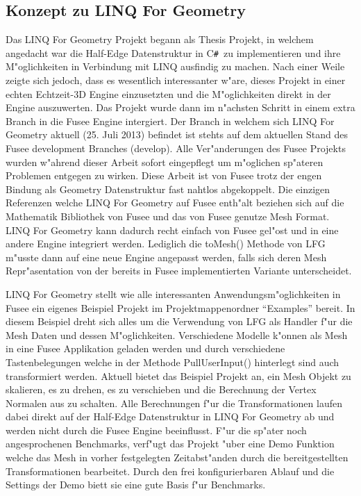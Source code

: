 \documentclass[pagesize, paper=a4, fontsize=12pt,titlepage=true, headings=small, headnosepline, abstractoff, liststotoc, nochapterprefix, plainheadsepline]{scrreprt}
\newcommand{\CSS}{C\texttt{\# }}
\newcommand{\LFG}{LINQ For Geometry}
\newcommand{\LFGS}{LINQ For Geometry }
\newcommand{\HES}{Half-Edge Datenstruktur }
\begin{document}
		\subsection {Konzept zu \LFG}
			Das \LFGS Projekt begann als Thesis Projekt, in welchem angedacht war die \HES in \CSS zu implementieren und ihre M"oglichkeiten in Verbindung mit LINQ ausfindig zu machen. Nach einer Weile zeigte sich jedoch, dass es wesentlich interessanter w"are, dieses Projekt in einer echten Echtzeit-3D Engine einzusetzten und die M"oglichkeiten direkt in der Engine auszuwerten. Das Projekt wurde dann im n"achsten Schritt in einem extra Branch in die Fusee Engine intergiert. Der Branch in welchem sich \LFGS aktuell (25. Juli 2013) befindet ist stehts auf dem aktuellen Stand des Fusee development Branches (develop). Alle Ver"anderungen des Fusee Projekts wurden w"ahrend dieser Arbeit sofort eingepflegt um m"oglichen sp"ateren Problemen entgegen zu wirken. Diese Arbeit ist von Fusee trotz der engen Bindung als Geometry Datenstruktur fast nahtlos abgekoppelt. Die einzigen Referenzen welche \LFGS auf Fusee enth"alt beziehen sich auf die Mathematik Bibliothek von Fusee und das von Fusee genutze Mesh Format. \LFGS kann dadurch recht einfach von Fusee gel"ost und in eine andere Engine integriert werden. Lediglich die toMesh() Methode von LFG m"usste dann auf eine neue Engine angepasst werden, falls sich deren Mesh Repr"asentation von der bereits in Fusee implementierten Variante unterscheidet.
\newline

\LFGS stellt wie alle interessanten Anwendungsm"oglichkeiten in Fusee ein eigenes Beispiel Projekt im Projektmappenordner "`Examples"' bereit. In diesem Beispiel dreht sich alles um die Verwendung von LFG als Handler f"ur die Mesh Daten und dessen M"oglichkeiten. Verschiedene Modelle k"onnen als Mesh in eine Fusee Applikation geladen werden und durch verschiedene Tastenbelegungen welche in der Methode  PullUserInput() hinterlegt sind auch transformiert werden. Aktuell bietet das Beispiel Projekt an, ein Mesh Objekt zu skalieren, es zu drehen, es zu verschieben und die Berechnung der Vertex Normalen aus zu schalten. Alle Berechnungen f"ur die Transformationen laufen dabei direkt auf der \HES in \LFGS ab und werden nicht durch die Fusee Engine beeinflusst. F"ur die sp"ater noch angesprochenen Benchmarks, verf"ugt das Projekt "uber eine Demo Funktion welche das Mesh in vorher festgelegten Zeitabst"anden durch die bereitgestellten Transformationen bearbeitet. Durch den frei konfigurierbaren Ablauf und die Settings der Demo biett sie eine gute Basis f"ur Benchmarks.
\newline
\end{document}
